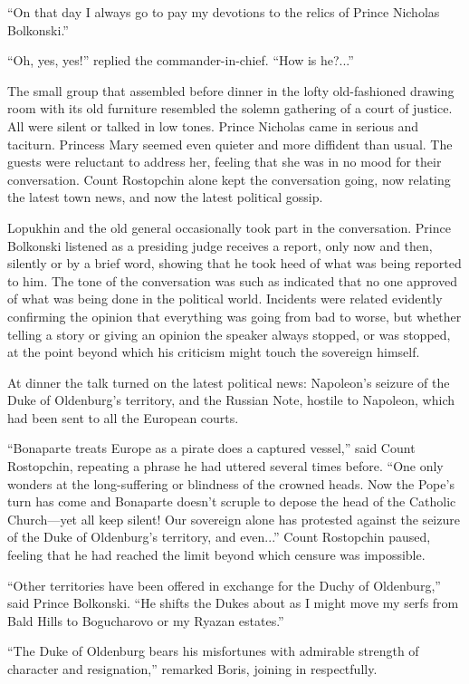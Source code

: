 ``On that day I always go to pay my devotions to the relics of
Prince Nicholas Bolkonski.''

``Oh, yes, yes!'' replied the commander-in-chief. ``How is
he?...''

The small group that assembled before dinner in the lofty
old-fashioned drawing room with its old furniture resembled the
solemn gathering of a court of justice. All were silent or talked
in low tones. Prince Nicholas came in serious and
taciturn. Princess Mary seemed even quieter and more diffident
than usual. The guests were reluctant to address her, feeling
that she was in no mood for their conversation. Count Rostopchin
alone kept the conversation going, now relating the latest town
news, and now the latest political gossip.

Lopukhin and the old general occasionally took part in the
conversation.  Prince Bolkonski listened as a presiding judge
receives a report, only now and then, silently or by a brief
word, showing that he took heed of what was being reported to
him. The tone of the conversation was such as indicated that no
one approved of what was being done in the political
world. Incidents were related evidently confirming the opinion
that everything was going from bad to worse, but whether telling
a story or giving an opinion the speaker always stopped, or was
stopped, at the point beyond which his criticism might touch the
sovereign himself.

At dinner the talk turned on the latest political news:
Napoleon's seizure of the Duke of Oldenburg's territory, and the
Russian Note, hostile to Napoleon, which had been sent to all the
European courts.

``Bonaparte treats Europe as a pirate does a captured vessel,''
said Count Rostopchin, repeating a phrase he had uttered several
times before. ``One only wonders at the long-suffering or
blindness of the crowned heads.  Now the Pope's turn has come and
Bonaparte doesn't scruple to depose the head of the Catholic
Church---yet all keep silent! Our sovereign alone has protested
against the seizure of the Duke of Oldenburg's territory, and
even...'' Count Rostopchin paused, feeling that he had reached
the limit beyond which censure was impossible.

``Other territories have been offered in exchange for the Duchy
of Oldenburg,'' said Prince Bolkonski. ``He shifts the Dukes
about as I might move my serfs from Bald Hills to Bogucharovo or
my Ryazan estates.''

``The Duke of Oldenburg bears his misfortunes with admirable
strength of character and resignation,'' remarked Boris, joining
in respectfully.

